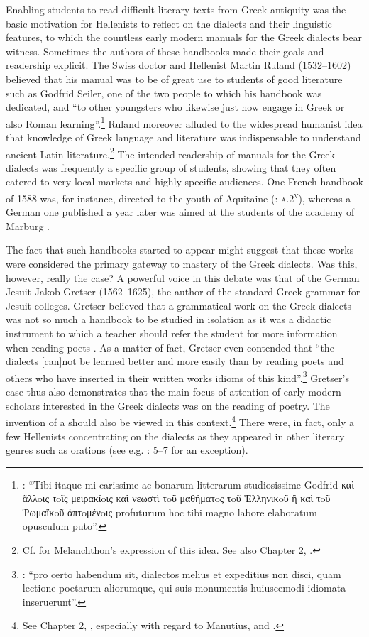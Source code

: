 Enabling students to read difficult literary texts from Greek antiquity was the basic motivation for Hellenists to reflect on the dialects and their linguistic features, to which the countless early modern manuals for the Greek dialects bear witness. Sometimes the authors of these handbooks made their goals and readership explicit. The Swiss doctor and Hellenist Martin Ruland (1532–1602) believed that his manual was to be of great use to students of good literature such as Godfrid Seiler, one of the two people to which his handbook was dedicated, and “to other youngsters who likewise just now engage in Greek or also Roman learning”.\footnote{\citet[α.4\textsc{\textsuperscript{v}}]{Ruland1556}: “Tibi itaque mi carissime ac bonarum litterarum studiosissime Godfrid καὶ ἄλλoις τoῖς μειρακίoις καὶ νεωστὶ τoῦ μαθήματoς τoῦ Ἑλληνικoῦ ἢ καὶ τoῦ Ῥωμαϊκoῦ ἁπτoμένoις profuturum hoc tibi magno labore elaboratum opusculum puto”.} Ruland moreover alluded to the widespread humanist idea that knowledge of Greek language and literature was indispensable to understand ancient Latin literature.\footnote{Cf. \citet[139]{Ben-Tov2009} for Melanchthon’s expression of this idea. See also Chapter 2, .} The intended readership of manuals for the Greek dialects was frequently a specific group of students, showing that they often catered to very local markets and highly specific audiences. One French handbook of 1588 was, for instance, directed to the youth of Aquitaine (\citealt{Baile1588}: \textsc{a.2}\textsc{\textsuperscript{v}}), whereas a German one published a year later was aimed at the students of the academy of Marburg \citep{Walper1589}.

The fact that such handbooks started to appear might suggest that these works were considered the primary gateway to mastery of the Greek dialects. Was this, however, really the case? A powerful voice in this debate was that of the German Jesuit Jakob Gretser (1562–1625), the author of the standard Greek grammar for Jesuit colleges. Gretser believed that a grammatical work on the Greek dialects was not so much a handbook to be studied in isolation as it was a didactic instrument to which a teacher should refer the student for more information when reading poets \citep[{\footnotesize)(}.5\textsc{\textsuperscript{v}}–\footnotesize{)(}.6\textsc{\textsuperscript{r}}]{Gretser1593}. As a matter of fact, Gretser even contended that “the dialects [can]not be learned better and more easily than by reading poets and others who have inserted in their written works idioms of this kind”.\footnote{\citet[)(.5\textsc{\textsuperscript{v}}]{Gretser1593}: “pro certo habendum sit, dialectos melius et expeditius non disci, quam lectione poetarum aliorumque, qui suis monumentis huiuscemodi idiomata inseruerunt”.} Gretser’s case thus also demonstrates that the main focus of attention of early modern scholars interested in the Greek dialects was on the reading of poetry. The invention of a  should also be viewed in this context.\footnote{See Chapter 2, , especially with regard to Manutius, and .} There were, in fact, only a few Hellenists concentrating on the dialects as they appeared in other literary genres such as orations (see e.g. \citealt{Labbe1639}: 5–7 for an exception).

